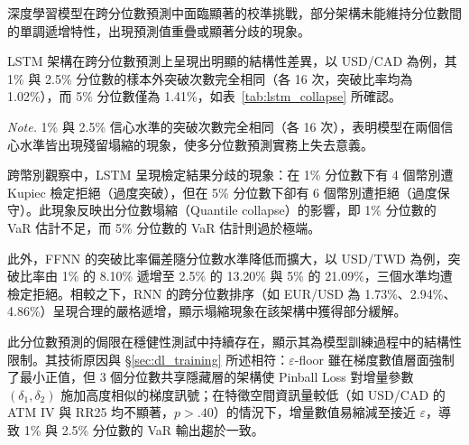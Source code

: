 深度學習模型在跨分位數預測中面臨顯著的校準挑戰，部分架構未能維持分位數間的單調遞增特性，出現預測值重疊或顯著分歧的現象。

LSTM 架構在跨分位數預測上呈現出明顯的結構性差異，以 USD/CAD 為例，其 1\% 與 2.5\% 分位數的樣本外突破次數完全相同（各 16 次，突破比率均為 1.02\%），而 5\% 分位數僅為 1.41\%，如表~\ref{tab:lstm_collapse} 所確認。

\begin{table}[htbp]
    \centering
    \linespread{1.2}\selectfont
    \renewcommand{\arraystretch}{1.2}
    \fontsize{11pt}{15pt}\selectfont
    \vspace{3mm}
    \caption{LSTM USD/CAD 殘留分位數塌縮：跨分位數突破比率}
    \label{tab:lstm_collapse}
    
    \vspace{3mm}
    
    \begin{minipage}{0.65\textwidth}
        \fontsize{9pt}{13pt}\selectfont
        \textit{Note.} 1\% 與 2.5\% 信心水準的突破次數完全相同（各 16 次），表明模型在兩個信心水準皆出現殘留塌縮的現象，使多分位數預測實務上失去意義。
    \end{minipage}
\end{table}

跨幣別觀察中，LSTM 呈現檢定結果分歧的現象：在 1\% 分位數下有 4 個幣別遭 Kupiec 檢定拒絕（過度突破），但在 5\% 分位數下卻有 6 個幣別遭拒絕（過度保守）。此現象反映出分位數塌縮（Quantile collapse）的影響，即 1\% 分位數的 VaR 估計不足，而 5\% 分位數的 VaR 估計則過於極端。

此外，FFNN 的突破比率偏差隨分位數水準降低而擴大，以 USD/TWD 為例，突破比率由 1\% 的 8.10\% 遞增至 2.5\% 的 13.20\% 與 5\% 的 21.09\%，三個水準均遭檢定拒絕。相較之下，RNN 的跨分位數排序（如 EUR/USD 為 1.73\%、2.94\%、4.86\%）呈現合理的嚴格遞增，顯示塌縮現象在該架構中獲得部分緩解。

此分位數預測的侷限在穩健性測試中持續存在，顯示其為模型訓練過程中的結構性限制。其技術原因與 \S\ref{sec:dl_training} 所述相符：$\varepsilon$-floor 雖在梯度數值層面強制了最小正值，但 3 個分位數共享隱藏層的架構使 Pinball Loss 對增量參數 $(\delta_1, \delta_2)$ 施加高度相似的梯度訊號；在特徵空間資訊量較低（如 USD/CAD 的 ATM IV 與 RR25 均不顯著，$p > .40$）的情況下，增量數值易縮減至接近 $\varepsilon$，導致 1\% 與 2.5\% 分位數的 VaR 輸出趨於一致。

